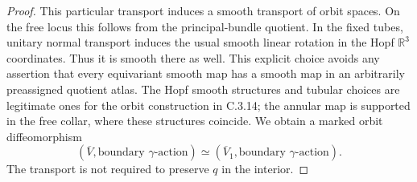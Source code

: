 \begin{proof}
This particular transport induces a smooth transport of orbit
spaces. On the free locus this follows from the principal-bundle
quotient. In the fixed tubes, unitary normal transport induces
the usual smooth linear rotation in the Hopf $\mathbb R^3$
coordinates. Thus it is smooth there as well. This explicit
choice avoids any assertion that every equivariant smooth map
has a smooth map in an arbitrarily preassigned quotient atlas.
The Hopf smooth structures and tubular choices are legitimate
ones for the orbit construction in C.3.14; the annular map is
supported in the free collar, where these structures coincide.
We obtain a marked orbit diffeomorphism
\[
 (\overline V,\text{boundary }\gamma\text{-action})
 \simeq(\overline V_1,\text{boundary }\gamma\text{-action}).
\]
The transport is not required to preserve $q$ in the interior.


\end{proof}
